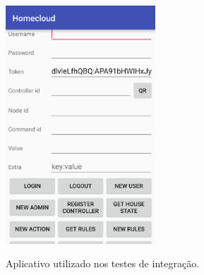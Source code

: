 \begin{figure}[h]
	\centering
	\caption{Aplicativo utilizado nos testes de integração.}
  \includegraphics[width=0.5\textwidth]{imagens/aplicativo_teste.png}
  \label{fig:aplicativo_teste}  
\end{figure}
